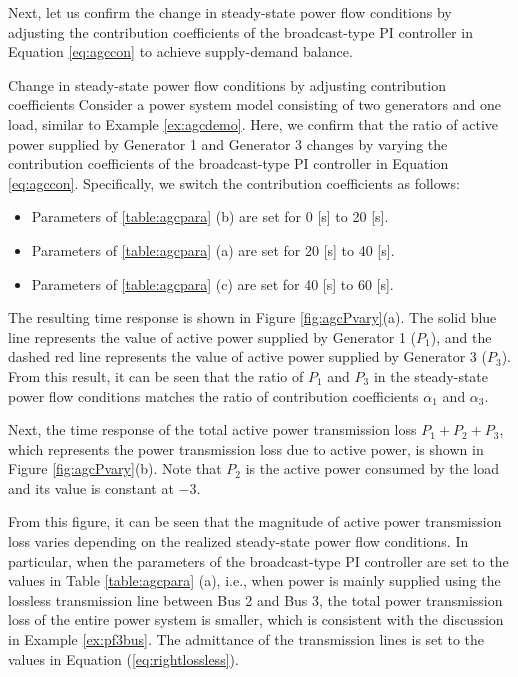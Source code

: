 \documentclass[graybox, envcountchap]{svmult}
\begin{document}
Next, let us confirm the change in steady-state power flow conditions by
adjusting the contribution coefficients of the broadcast-type PI controller in
Equation \ref{eq:agccon} to achieve supply-demand balance.

\begin{example}{Change in steady-state power flow conditions by adjusting contribution coefficients}\label{ex:pfvary}
Consider a power system model consisting of two generators and one load, similar
to Example \ref{ex:agcdemo}. Here, we confirm that the ratio of active power
supplied by Generator 1 and Generator 3 changes by varying the contribution
coefficients of the broadcast-type PI controller in Equation \ref{eq:agccon}.
Specifically, we switch the contribution coefficients as follows:

\begin{itemize}
\item Parameters of \ref{table:agcpara} (b) are set for 0 [s] to 20 [s].
\item Parameters of \ref{table:agcpara} (a) are set for 20 [s] to 40 [s].
\item Parameters of \ref{table:agcpara} (c) are set for 40 [s] to 60 [s].
\end{itemize}

The resulting time response is shown in Figure \ref{fig:agcPvary}(a). The solid
blue line represents the value of active power supplied by Generator 1 ($P_1$),
and the dashed red line represents the value of active power supplied by
Generator 3 ($P_3$). From this result, it can be seen that the ratio of $P_1$
and $P_3$ in the steady-state power flow conditions matches the ratio of
contribution coefficients $\alpha_1$ and $\alpha_3$.

Next, the time response of the total active power transmission loss
$P_1+P_2+P_3$, which represents the power transmission loss due to active power,
is shown in Figure \ref{fig:agcPvary}(b). Note that $P_2$ is the active power
consumed by the load and its value is constant at $-3$.

From this figure, it can be seen that the magnitude of active power transmission
loss varies depending on the realized steady-state power flow conditions. In
particular, when the parameters of the broadcast-type PI controller are set to
the values in Table \ref{table:agcpara} (a), i.e., when power is mainly supplied
using the lossless transmission line between Bus 2 and Bus 3, the total power
transmission loss of the entire power system is smaller, which is consistent
with the discussion in Example \ref{ex:pf3bus}. The admittance of the
transmission lines is set to the values in Equation (\ref{eq:rightlossless}).
\end{example}
\end{document}
